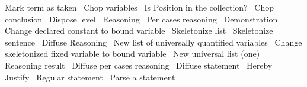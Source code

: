 \LA{}Mark term as taken~{\nwtagstyle{}}\RA{}
\LA{}Chop variables~{\nwtagstyle{}}\RA{}
\LA{}Is \code{}Position\edoc{} in the collection?~{\nwtagstyle{}}\RA{}
\LA{}Chop conclusion~{\nwtagstyle{}}\RA{}
\LA{}Dispose level~{\nwtagstyle{}}\RA{}
\LA{}Reasoning~{\nwtagstyle{}}\RA{}
\LA{}Per cases reasoning~{\nwtagstyle{}}\RA{}
\LA{}Demonstration~{\nwtagstyle{}}\RA{}
\LA{}Change declared constant to bound variable~{\nwtagstyle{}}\RA{}
\LA{}Skeletonize list~{\nwtagstyle{}}\RA{}
\LA{}Skeletonize sentence~{\nwtagstyle{}}\RA{}
\LA{}Diffuse Reasoning~{\nwtagstyle{}}\RA{}
\LA{}New list of universally quantified variables~{\nwtagstyle{}}\RA{}
\LA{}Change skeletonized fixed variable to bound variable~{\nwtagstyle{}}\RA{}
\LA{}New universal list (one)~{\nwtagstyle{}}\RA{}
\LA{}Reasoning result~{\nwtagstyle{}}\RA{}
\LA{}Diffuse per cases reasoning~{\nwtagstyle{}}\RA{}
\LA{}Diffuse statement~{\nwtagstyle{}}\RA{}
\LA{}Hereby~{\nwtagstyle{}}\RA{}
\LA{}Justify~{\nwtagstyle{}}\RA{}
\LA{}Regular statement~{\nwtagstyle{}}\RA{}
\LA{}Parse a statement~{\nwtagstyle{}}\RA{}
\nwendcode{}\nwdocspar


